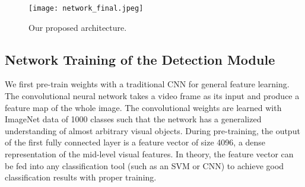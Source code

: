 \documentclass{article}
\begin{document}
\begin{figure}[t] %
	\centering
	\captionsetup{justification=centering}
	\texttt{[image: network\_final.jpeg]}
	\caption{Our proposed architecture.}
	\label{fig-network}
\end{figure}


\subsection{Network Training of the Detection Module}

We first pre-train weights with a traditional CNN for general feature learning. The convolutional neural network takes a video frame as its input and produce a feature map of the whole image. 
The convolutional weights are learned with ImageNet data of 1000 classes such that the network has a generalized understanding of almost arbitrary visual objects. During pre-training, the output of the first fully connected layer is a feature vector of size 4096, a dense representation of the mid-level visual features. In theory, the feature vector can be fed into any classification tool (such as an SVM or CNN) to achieve good classification results with proper training.
\end{document}
